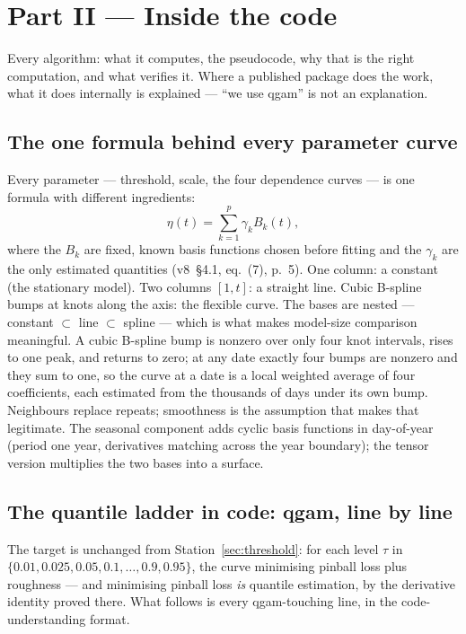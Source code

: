 \documentclass[11pt]{article}
\begin{document}
\section*{Part II --- Inside the code}

Every algorithm: what it computes, the pseudocode, why that is the right
computation, and what verifies it. Where a published package does the work,
what it does internally is explained --- ``we use qgam'' is not an
explanation.

\subsection{The one formula behind every parameter curve}

Every parameter --- threshold, scale, the four dependence curves --- is one
formula with different ingredients:
\[
\eta(t) = \sum_{k=1}^{p} \gamma_k B_k(t),
\]
where the $B_k$ are fixed, known basis functions chosen before fitting and
the $\gamma_k$ are the only estimated quantities (v8~\S4.1, eq.~(7), p.~5).
One column: a constant (the stationary model). Two columns $[1, t]$: a
straight line. Cubic B-spline bumps at knots along the axis: the flexible
curve. The bases are nested --- constant $\subset$ line $\subset$ spline ---
which is what makes model-size comparison meaningful. A cubic B-spline bump
is nonzero over only four knot intervals, rises to one peak, and returns to
zero; at any date exactly four bumps are nonzero and they sum to one, so the
curve at a date is a local weighted average of four coefficients, each
estimated from the thousands of days under its own bump. Neighbours replace
repeats; smoothness is the assumption that makes that legitimate. The
seasonal component adds cyclic basis functions in day-of-year (period one
year, derivatives matching across the year boundary); the tensor version
multiplies the two bases into a surface.

\subsection{The quantile ladder in code: qgam, line by line}
\label{sec:qgamcode}

The target is unchanged from Station~\ref{sec:threshold}: for each level
$\tau$ in $\{0.01, 0.025, 0.05, 0.1, \ldots, 0.9, 0.95\}$, the curve
minimising pinball loss plus roughness --- and minimising pinball loss
\emph{is} quantile estimation, by the derivative identity proved there.
What follows is every qgam-touching line, in the code-understanding format.
\end{document}
